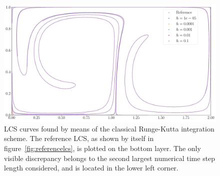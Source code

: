 \begin{figure}[htpb]
    \centering
    \includegraphics[width=0.8\linewidth]{figures/lcs_figures/rk4.pdf}
    \caption[LCS curves found by means of the classical Runge-Kutta integration scheme]{
        LCS curves found by means of the classical Runge-Kutta integration scheme. The
        reference LCS, as shown by itself in figure~\ref{fig:referencelcs},
        is plotted on the bottom layer. The only visible discrepancy belongs
        to the second largest numerical time step length considered, and is
        located in the lower left corner.}
    \label{fig:lcs_rk4}
\end{figure}
